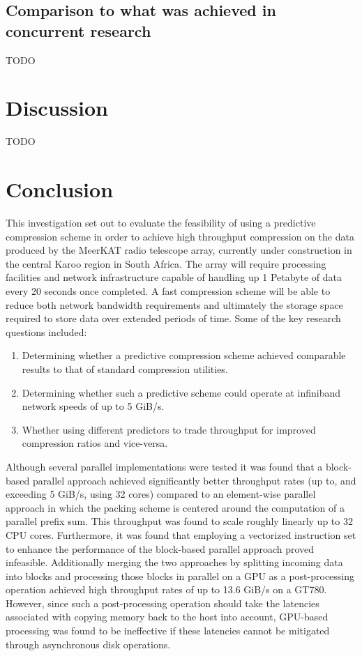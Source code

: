 \subsection{Comparison to what was achieved in concurrent research}
{\color{red}TODO}
\section{Discussion}
{\color{red}TODO}
\section{Conclusion}
This investigation set out to evaluate the feasibility of using a predictive compression scheme in order to achieve high throughput compression on the data produced by the MeerKAT radio telescope array, currently under construction
in the central Karoo region in South Africa. The array will require processing facilities and network infrastructure capable of handling up 1 Petabyte of data every 20 seconds once completed. A fast compression scheme will be able
to reduce both network bandwidth requirements and ultimately the storage space required to store data over extended periods of time. Some of the key research questions included:
\begin{enumerate}
 \item Determining whether a predictive compression scheme achieved comparable results to that of standard compression utilities.
 \item Determining whether such a predictive scheme could operate at infiniband network speeds of up to 5 GiB/s.
 \item Whether using different predictors to trade throughput for improved compression ratios and vice-versa.
\end{enumerate}
Although several parallel implementations were tested it was found that a block-based parallel approach achieved significantly better throughput rates (up to, and exceeding 5 GiB/s, using 32 cores) compared to an 
element-wise parallel approach in which the packing scheme is centered around the computation of a parallel prefix sum. This throughput was found to scale roughly linearly up to 32 CPU cores. Furthermore, it was 
found that employing a vectorized instruction set to enhance the performance of the block-based parallel approach proved infeasible. Additionally merging the two approaches by splitting incoming data into blocks 
and processing those blocks in parallel on a GPU as a post-processing operation achieved high throughput rates of up to 13.6 GiB/s on a GT780. However, since such a post-processing operation should take the 
latencies associated with copying memory back to the host into account, GPU-based processing was found to be ineffective if these latencies cannot be mitigated through asynchronous disk operations.

